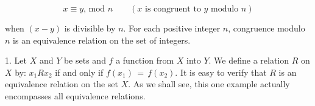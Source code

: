 \[x\equiv y,\,\mbox{mod}\,\,n\qquad(x\mbox{ is congruent to }y\mbox{ modulo }n)\]

when \((x-y)\) is divisible by \(n\). For each positive integer \(n\), congruence modulo \(n\) is an equivalence relation on the set of integers.

1. Let \(X\) and \(Y\) be sets and \(f\) a function from \(X\) into \(Y\). We define a relation \(R\) on \(X\) by: \(x_{1}Rx_{2}\) if and only if \(f(x_{1})\,=\,f(x_{2})\). It is easy to verify that \(R\) is an equivalence relation on the set \(X\). As we shall see, this one example actually encompasses all equivalence relations.

 